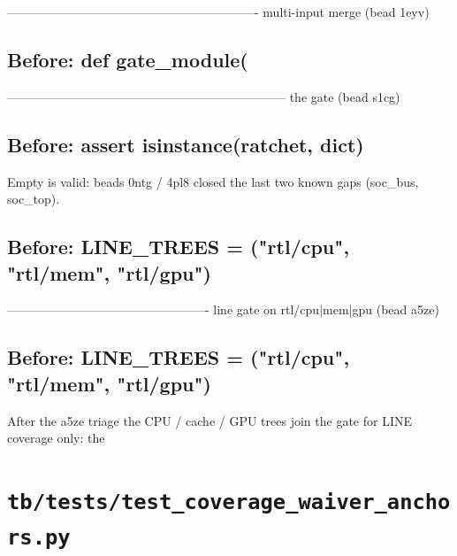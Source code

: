 \begin{record}
\begin{textblock}
------------------------------------------------------------- multi-input merge (bead 1eyv)
\end{textblock}

\subsection*{Before: def gate\_module(}

\begin{textblock}
-------------------------------------------------------------------- the gate (bead s1cg)
\end{textblock}

\subsection*{Before: assert isinstance(ratchet, dict)}

\begin{textblock}
Empty is valid: beads 0ntg / 4pl8 closed the last two known gaps (soc_bus, soc_top).
\end{textblock}

\subsection*{Before: LINE\_TREES = ("rtl/cpu", "rtl/mem", "rtl/gpu")}

\begin{textblock}
------------------------------------------------- line gate on rtl/cpu|mem|gpu (bead a5ze)
\end{textblock}

\subsection*{Before: LINE\_TREES = ("rtl/cpu", "rtl/mem", "rtl/gpu")}

\begin{textblock}
After the a5ze triage the CPU / cache / GPU trees join the gate for LINE coverage only: the
\end{textblock}

\end{record}

\section{\texttt{tb/tests/test\_coverage\_waiver\_anchors.py}}\label{cr:suite:test-coverage-waiver-anchors}

